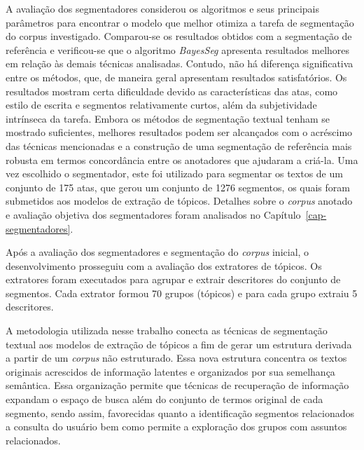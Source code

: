 A avaliação dos segmentadores considerou os algoritmos e seus principais parâmetros para encontrar o modelo que melhor otimiza a tarefa de segmentação do corpus investigado. Comparou-se os resultados obtidos com a segmentação de referência e verificou-se que o algoritmo \textit{BayesSeg} apresenta resultados melhores em relação às demais técnicas analisadas. Contudo, não há diferença significativa entre os métodos, que,  de maneira geral apresentam resultados satisfatórios.  
Os resultados mostram certa dificuldade devido as características das atas, como estilo de escrita e segmentos relativamente curtos, além da subjetividade intrínseca da tarefa.
Embora os métodos de segmentação textual tenham se mostrado suficientes, melhores resultados podem ser alcançados com o acréscimo das técnicas mencionadas e a construção de uma segmentação de referência mais robusta em termos concordância entre os anotadores que ajudaram a criá-la.
Uma vez escolhido o segmentador, este foi utilizado para segmentar os textos de um conjunto de 175 atas, que gerou um conjunto de 1276 segmentos, os quais foram submetidos aos modelos de extração de tópicos.
Detalhes sobre o \textit{corpus} anotado e avaliação objetiva dos segmentadores foram analisados no Capítulo~\ref{cap-segmentadores}.




Após a avaliação dos segmentadores e segmentação do \textit{corpus} inicial, o desenvolvimento prosseguiu com a avaliação dos extratores de tópicos. Os extratores foram executados para agrupar e extrair descritores do conjunto de segmentos. Cada extrator formou 70 grupos (tópicos) e para cada grupo extraiu 5 descritores. 

A metodologia utilizada nesse trabalho conecta as técnicas de segmentação textual aos modelos de extração de tópicos a fim de gerar um estrutura derivada a partir de um \textit{corpus} não estruturado. Essa nova estrutura concentra os textos originais acrescidos de informação latentes e organizados por sua semelhança semântica. Essa organização permite que técnicas de recuperação de informação expandam o espaço de busca além do conjunto de termos original de cada segmento, sendo assim, favorecidas quanto a identificação segmentos relacionados a consulta do usuário bem como permite a exploração dos grupos com assuntos relacionados.







